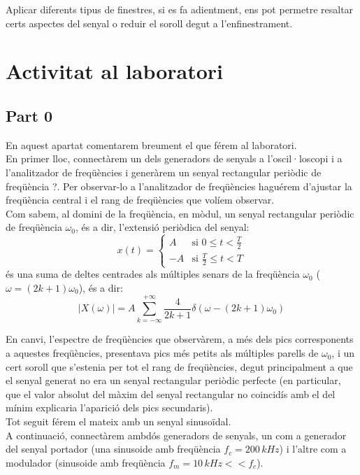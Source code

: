\documentclass[11pt,a4]{article}
\numberwithin{equation}{section}
\theoremstyle{thmstyle}
\theoremstyle{thmstyle}
\theoremstyle{thmstyle}
\theoremstyle{thmstyle}
\theoremstyle{thmstyle}
\theoremstyle{thmstyle}
\theoremstyle{thmstyle}
\begin{document}
Aplicar diferents tipus de finestres, si es fa adientment, ens pot permetre resaltar certs aspectes del senyal o reduir el soroll degut a l'enfinestrament.

\section{Activitat al laboratori}

\subsection{Part 0}

En aquest apartat comentarem breument el que férem al laboratori.
\\

En primer lloc, connectàrem un dels generadors de senyals a l'oscil·loscopi i a l'analitzador de freqüències  i generàrem un senyal rectangular periòdic de freqüència ?. Per observar-lo a l'analitzador de freqüències haguérem d'ajustar la freqüència central i el rang de freqüències que volíem observar. 
\\

Com sabem, al domini de la freqüència, en mòdul, un senyal rectangular periòdic de freqüència $\omega_0$, és a dir, l'extensió periòdica del senyal:
$$
x(t) = 
\begin{cases}
A        & \text{si $0\leqslant t<\frac{T}{2}$} \\
-A       & \text{si $\frac{T}{2}\leqslant t<T$}
\end{cases}
$$
és una suma de deltes centrades als múltiples senars de la freqüència $\omega_0$ ($\omega = (2k+1)\omega_0$), és a dir:
$$
\vert X(\omega)\vert = A\sum_{k = -\infty}^{+\infty} \frac{4}{2k+1}\delta(\omega-(2k+1)\omega_0)
$$

En canvi, l'espectre de freqüències que observàrem, a més dels pics corresponents a aquestes freqüències, presentava pics més petits als múltiples parells de $\omega_0$, i un cert soroll que s'estenia per tot el rang de freqüències, degut principalment a que el senyal generat no era un senyal rectangular periòdic perfecte (en particular, que el valor absolut del màxim del senyal rectangular no coincidís amb el del mínim explicaria l'aparició dels pics secundaris).
\\

Tot seguit férem el mateix amb un senyal sinusoïdal. 
\\

A continuació, connectàrem ambdós generadors de senyals, un com a generador del senyal portador (una sinusoide amb freqüència $f_c=200\,kHz$) i l'altre com a modulador (sinusoide amb freqüència $f_m=10\,kHz << f_c$).
\\
\end{document}
